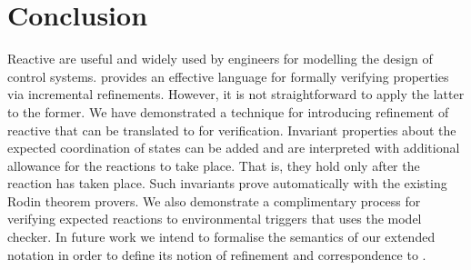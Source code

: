 \section{Conclusion}
\label{sec:conc}

Reactive \SCs are useful and widely used by engineers for modelling the design of control systems. 
\EventB provides an effective language for formally verifying properties via incremental refinements.
However, it is not straightforward to apply the latter to the former.
We have demonstrated a technique for introducing refinement of reactive \SCs that can be translated to \EventB for verification.
Invariant properties about the expected coordination of states can be added and are interpreted with additional allowance for the reactions to take place.
That is, they hold only after the reaction has taken place.
Such invariants prove automatically with the existing Rodin theorem provers.
We also demonstrate a complimentary process for verifying expected reactions to environmental triggers that uses the \LTL model checker.
In future work we intend to formalise the semantics of our extended \SCXML notation in order to define its notion of refinement and correspondence to \EventB. 



